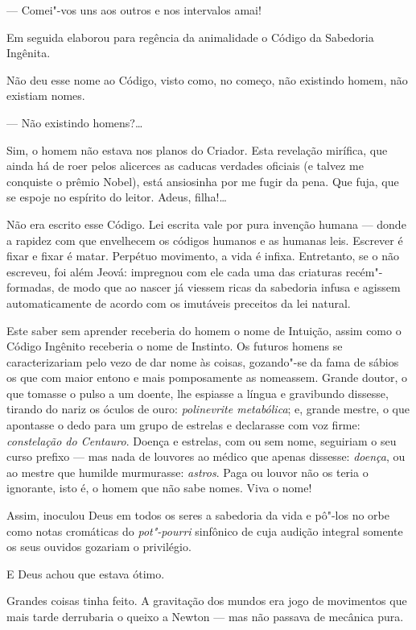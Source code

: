 --- Comei"-vos uns aos outros e nos intervalos amai!

Em seguida elaborou para regência da animalidade o Código da Sabedoria
Ingênita.

Não deu esse nome ao Código, visto como, no começo, não existindo homem,
não existiam nomes.

--- Não existindo homens?\ldots{}

Sim, o homem não estava nos planos do Criador. Esta revelação mirífica,
que ainda há de roer pelos alicerces as caducas verdades oficiais (e
talvez me conquiste o prêmio Nobel), está ansiosinha por me fugir da
pena. Que fuja, que se espoje no espírito do leitor. Adeus, filha!\ldots{}

Não era escrito esse Código. Lei escrita vale por pura invenção humana
--- donde a rapidez com que envelhecem os códigos humanos e as humanas
leis. Escrever é fixar e fixar é matar. Perpétuo movimento, a vida é
infixa. Entretanto, se o não escreveu, foi além Jeová: impregnou com ele
cada uma das criaturas recém"-formadas, de modo que ao nascer já viessem
ricas da sabedoria infusa e agissem automaticamente de acordo com os
imutáveis preceitos da lei natural.

Este saber sem aprender receberia do homem o nome de Intuição, assim
como o Código Ingênito receberia o nome de Instinto. Os futuros homens
se caracterizariam pelo vezo de dar nome às coisas, gozando"-se da fama
de sábios os que com maior entono e mais pomposamente as nomeassem.
Grande doutor, o que tomasse o pulso a um doente, lhe espiasse a língua
e gravibundo dissesse, tirando do nariz os óculos de ouro:
\emph{polinevrite metabólica}; e, grande mestre, o que apontasse o dedo
para um grupo de estrelas e declarasse com voz firme: \emph{constelação
do Centauro}. Doença e estrelas, com ou sem nome, seguiriam o seu curso
prefixo --- mas nada de louvores ao médico que apenas dissesse:
\emph{doença}, ou ao mestre que humilde murmurasse: \emph{astros}. Paga
ou louvor não os teria o ignorante, isto é, o homem que não sabe nomes.
Viva o nome!

Assim, inoculou Deus em todos os seres a sabedoria da vida e pô"-los no
orbe como notas cromáticas do \emph{pot"-pourri} sinfônico de cuja
audição integral somente os seus ouvidos gozariam o privilégio.

E Deus achou que estava ótimo.

Grandes coisas tinha feito. A gravitação dos mundos era jogo de
movimentos que mais tarde derrubaria o queixo a Newton --- mas não
passava de mecânica pura.

